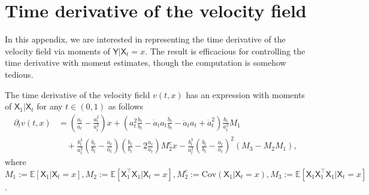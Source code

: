 \documentclass[twoside,11pt]{article}
\newcommand{\E}{\mathbb{E}}
\newcommand{\Cov}{\mathrm{Cov}}
\numberwithin{equation}{section}
\begin{document}
\section{Time derivative of the velocity field}
In this appendix, we are interested in representing the time derivative of the velocity field via moments of $\mathsf{Y} | \mathsf{X}_t = x$. The result is efficacious for controlling the time derivative with moment estimates, though the computation is somehow tedious.
\begin{proposition}
The time derivative of the velocity field $v(t, x)$ has an expression with moments of $\mathsf{X}_1 | \mathsf{X}_t$ for any $t \in (0, 1)$  as follows
\begin{align*}
    \partial_t v(t, x)
    &= \left( \frac{\ddot{a}_t}{a_t} - \frac{\dot{a}_t^2}{a_t^2} \right) x
       + \left( a_t^2 \frac{\ddot{b}_t}{b_t} - \dot{a}_t a_t \frac{\dot{b}_t}{b_t} - \ddot{a}_t a_t + \dot{a}^2_t \right) \frac{b_t}{a_t^2} M_1 \\
    & \quad + \frac{b_t^2}{a_t^2} \left( \frac{\dot{b}_t}{b_t} - \frac{\dot{a}_t}{a_t} \right) \left( \frac{\dot{b}_t}{b_t} - 2 \frac{\dot{a}_t}{a_t} \right) M^c_2 x
      - \frac{b_t^3}{a_t^2} \left( \frac{\dot{b}_t}{b_t} - \frac{\dot{a}_t}{a_t} \right)^2
      \left( M_3 - M_2 M_1 \right),
\end{align*}
where $M_1 := \E [\mathsf{X}_1 | \mathsf{X}_t = x],  M_2 := \E [\mathsf{X}_1^{\top} \mathsf{X}_1 | \mathsf{X}_t = x], M^c_2 := \Cov(\mathsf{X}_1 | \mathsf{X}_t = x), M_3 := \E [\mathsf{X}_1 \mathsf{X}_1^{\top} \mathsf{X}_1 | \mathsf{X}_t = x]$.
\end{proposition}
\end{document}
